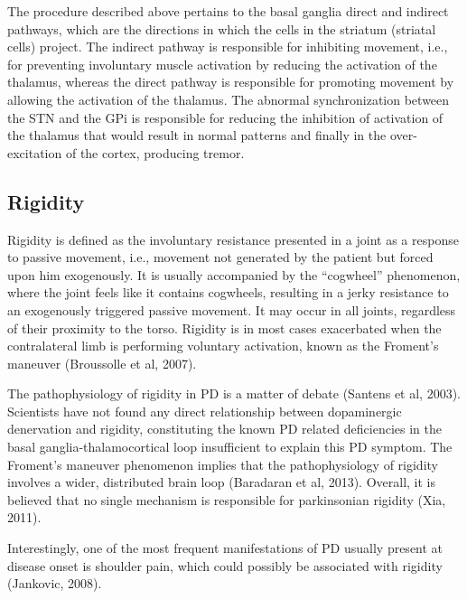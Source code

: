 The procedure described above pertains to the basal ganglia direct and indirect pathways, which are the directions in which the cells in the striatum (striatal cells) project. The indirect pathway is responsible for inhibiting movement, i.e., for preventing involuntary muscle activation by reducing the activation of the thalamus, whereas the direct pathway is responsible for promoting movement by allowing the activation of the thalamus. The abnormal synchronization between the STN and the GPi is responsible for reducing the inhibition of activation of the thalamus that would result in normal patterns and finally in the over-excitation of the cortex, producing tremor. 



\subsection{Rigidity}
\label{subsec:rigidity}
Rigidity is defined as the involuntary resistance presented in a joint as a response to passive movement, i.e., movement not generated by the patient but forced upon him exogenously. It is usually accompanied by the ``cogwheel'' phenomenon, where the joint feels like it contains cogwheels, resulting in a jerky resistance to an exogenously triggered passive movement. It may occur in all joints, regardless of their proximity to the torso. Rigidity is in most cases exacerbated when the contralateral limb is performing voluntary activation, known as the Froment's maneuver (Broussolle et al, 2007).

The pathophysiology of rigidity in \gls{PD} is a matter of debate (Santens et al, 2003). Scientists have not found any direct relationship between dopaminergic denervation and rigidity, constituting the known \gls{PD} related deficiencies in the basal ganglia-thalamocortical loop insufficient to explain this \gls{PD} symptom. The Froment's maneuver phenomenon implies that the pathophysiology of rigidity involves a wider, distributed brain loop (Baradaran et al, 2013). Overall, it is believed that no single mechanism is responsible for parkinsonian rigidity (Xia, 2011).

Interestingly, one of the most frequent manifestations of \gls{PD} usually present at disease onset is shoulder pain, which could possibly be associated with rigidity (Jankovic, 2008).



